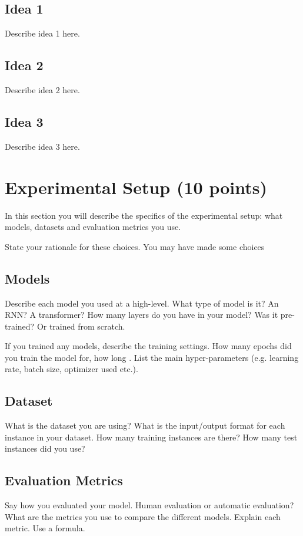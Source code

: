 \documentclass[11pt,a4paper]{article}
\begin{document}
\subsection{Idea 1}

Describe idea 1 here. 

\subsection{Idea 2}

Describe idea 2 here.

\subsection{Idea 3}

Describe idea 3 here.

\section{Experimental Setup (10 points)}

In this section you will describe the specifics of the experimental setup: what models, datasets and evaluation metrics you use. 

State your rationale for these choices. You may have made some choices 

\subsection{Models}
Describe each model you used at a high-level. What type of model is it? An RNN? A transformer? How many layers do you have in your model? Was it pre-trained? Or trained from scratch. 

If you trained any models, describe the training settings. How many epochs did you train the model for, how long . List the main hyper-parameters (e.g. learning rate, batch size, optimizer used etc.). 

\subsection{Dataset} What is the dataset you are using? What is the input/output format for each instance in your dataset. How many training instances are there? How many test instances did you use?

\subsection{Evaluation Metrics} Say how you evaluated your model. Human evaluation or automatic evaluation? What are the metrics you use to compare the different models. Explain each metric. Use a formula.
\end{document}
